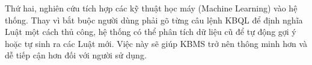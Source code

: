 \documentclass[13pt,a4paper,oneside]{extreport}
\begin{document}
Thứ hai, nghiên cứu tích hợp các kỹ thuật học máy (Machine Learning) vào hệ thống. Thay vì bắt buộc người dùng phải gõ từng câu lệnh KBQL để định nghĩa Luật một cách thủ công, hệ thống có thể phân tích dữ liệu cũ để tự động gợi ý hoặc tự sinh ra các Luật mới. Việc này sẽ giúp KBMS trở nên thông minh hơn và dễ tiếp cận hơn đối với người sử dụng.


\clearpage

\clearpage
\printbibliography[heading=bibintoc, title={TÀI LIỆU THAM KHẢO}]
\end{document}
